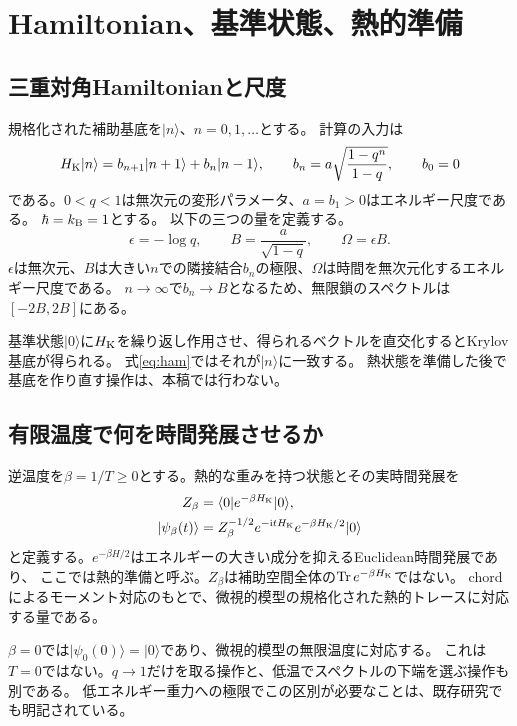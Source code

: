\documentclass[a4paper,11pt]{ltjsarticle}
\numberwithin{equation}{section}
\newcommand{\ket}[1]{\lvert#1\rangle}
\newcommand{\bra}[1]{\langle#1\rvert}
\newcommand{\ii}{\mathrm i}
\begin{document}
\section{Hamiltonian、基準状態、熱的準備}
\subsection{三重対角Hamiltonianと尺度}
規格化された補助基底を$\ket n$、$n=0,1,\ldots$とする。
計算の入力は
\begin{equation}
 H_{\rm K}\ket n=b_{n+1}\ket{n+1}+b_n\ket{n-1},\qquad
 b_n=a\sqrt{\frac{1-q^n}{1-q}},\qquad b_0=0
 \label{eq:ham}
\end{equation}
である。$0<q<1$は無次元の変形パラメータ、$a=b_1>0$はエネルギー尺度である。
$\hbar=k_{\rm B}=1$とする。
以下の三つの量を定義する。
\begin{equation}
 \epsilon=-\log q,\qquad B=\frac{a}{\sqrt{1-q}},\qquad
 \Omega=\epsilon B.
 \label{eq:scales}
\end{equation}
$\epsilon$は無次元、$B$は大きい$n$での隣接結合$b_n$の極限、$\Omega$は時間を無次元化するエネルギー尺度である。
$n\to\infty$で$b_n\to B$となるため、無限鎖のスペクトルは$[-2B,2B]$にある。

基準状態$\ket0$に$H_{\rm K}$を繰り返し作用させ、得られるベクトルを直交化するとKrylov基底が得られる。
式\eqref{eq:ham}ではそれが$\ket n$に一致する。
熱状態を準備した後で基底を作り直す操作は、本稿では行わない。

\subsection{有限温度で何を時間発展させるか}
逆温度を$\beta=1/T\geq0$とする。熱的な重みを持つ状態とその実時間発展を
\begin{align}
 Z_\beta&=\bra0 e^{-\beta H_{\rm K}}\ket0,\\
 \ket{\psi_\beta(t)}&=Z_\beta^{-1/2}
 e^{-\ii tH_{\rm K}}e^{-\beta H_{\rm K}/2}\ket0
 \label{eq:thermal}
\end{align}
と定義する。$e^{-\beta H/2}$はエネルギーの大きい成分を抑えるEuclidean時間発展であり、
ここでは熱的準備と呼ぶ。$Z_\beta$は補助空間全体の$\operatorname{Tr}e^{-\beta H_{\rm K}}$ではない。
chordによるモーメント対応のもとで、微視的模型の規格化された熱的トレースに対応する量である\cite{Heller,Forste}。

$\beta=0$では$\ket{\psi_0(0)}=\ket0$であり、微視的模型の無限温度に対応する。
これは$T=0$ではない。$q\to1$だけを取る操作と、低温でスペクトルの下端を選ぶ操作も別である。
低エネルギー重力への極限でこの区別が必要なことは、既存研究でも明記されている\cite{Heller,Rabinovici}。
\end{document}
